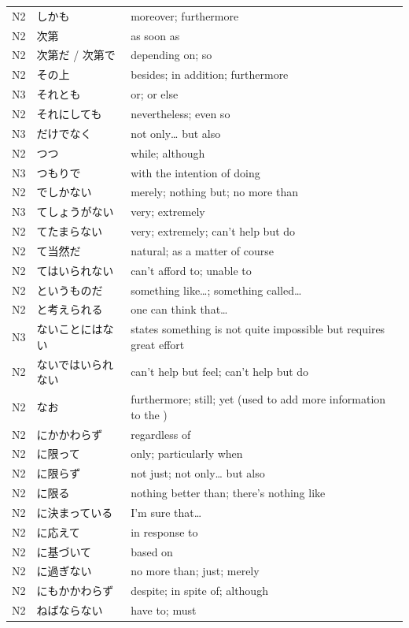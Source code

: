 \begin{longtable}{p{2cm} p{4cm} p{8cm}}
N2	&   しかも	&       moreover; furthermore\\
N2	&   次第	     &      as soon as\\
N2	&   次第だ / 次第で &	depending on; so\\
N2	&   その上	&       besides; in addition; furthermore\\
N3	&   それとも  &	    or; or else\\
N2	&   それにしても & 	nevertheless; even so\\
N3	&   だけでなく   &	not only… but also\\
N2	&   つつ	&           while; although\\
N3	&   つもりで	&       with the intention of doing\\
N2	&   でしかない	&   merely; nothing but; no more than\\
N3	&   てしょうがない & 	very; extremely\\
N2	&   てたまらない	&   very; extremely; can't help but do\\
N2	&   て当然だ	&       natural; as a matter of course\\
N2	&   てはいられない & 	can't afford to; unable to\\
N2	&   というものだ  &	something like…; something called…\\
N2	&   と考えられる &	one can think that…\\
N3	&   ないことにはない &	states something is not quite impossible but requires great effort\\
N2	&   ないではいられない & can't help but feel; can't help but do\\
N2	&   なお	    &        furthermore; still; yet (used to add more information to the )\\
N2	&   にかかわらず &	regardless of\\
N2	&   に限って &	    only; particularly when\\
N2	&   に限らず &	    not just; not only… but also\\
N2	&   に限る &       	nothing better than; there's nothing like\\
N2	&   に決まっている &	I'm sure that…\\
N2	&   に応えて	    &   in response to\\
N2	&   に基づいて   &   	based on\\
N2	&   に過ぎない	&   no more than; just; merely\\
N2	&   にもかかわらず &	despite; in spite of; although\\
N2	&   ねばならない  &	have to; must\\

\end{longtable}
